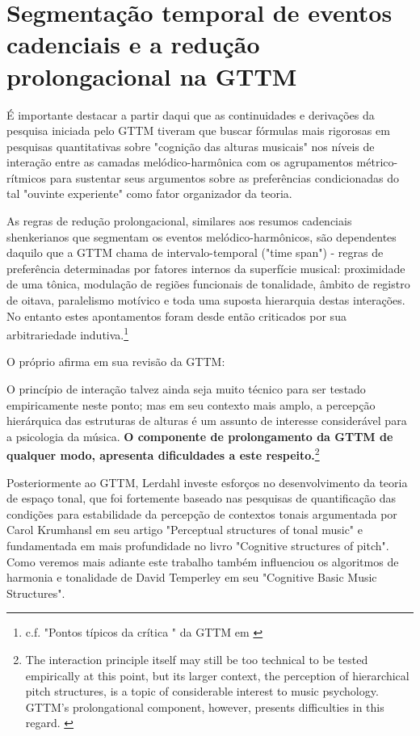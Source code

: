 \documentclass[
	12pt,				%
	openright,			%
	twoside,			%
	a4paper,			%
	english,			%
	french,				%
	spanish,			%
	brazil				%
	]{abntex2}
\begin{document}
\section{Segmentação temporal de eventos cadenciais e a redução prolongacional na GTTM}


É importante destacar a partir daqui que as continuidades e derivações da pesquisa iniciada pelo GTTM tiveram que buscar fórmulas mais rigorosas em pesquisas quantitativas sobre "cognição das alturas musicais"\cite{krumhansl1990cognitive} nos níveis de interação entre as camadas melódico-harmônica com os agrupamentos métrico-rítmicos para sustentar seus argumentos sobre as preferências condicionadas do tal "ouvinte experiente"\cite[pg. 118]{lerdahl1983generative} como fator organizador da teoria. 

As regras de redução prolongacional, similares aos resumos cadenciais shenkerianos que segmentam os eventos melódico-harmônicos, são dependentes daquilo que a GTTM chama de intervalo-temporal ("time span") - regras de preferência determinadas por fatores internos da superfície musical: proximidade de uma tônica, modulação de regiões funcionais de tonalidade, âmbito de registro de oitava, paralelismo motívico e toda uma suposta hierarquia destas interações. No entanto estes apontamentos foram desde então criticados por sua arbitrariedade indutiva.\footnote{ c.f. "Pontos típicos da crítica " da GTTM em \cite[pg. 35]{hansen2011legacy} }

O próprio  afirma em sua revisão da GTTM:


\begin{citacao}
O princípio de interação talvez ainda seja muito técnico para ser testado empiricamente neste ponto; mas em seu contexto mais amplo, a percepção hierárquica das estruturas de alturas é um assunto de interesse considerável para a psicologia da música.\textbf{ O componente de prolongamento da GTTM de qualquer modo, apresenta dificuldades a este respeito.}\cite[p. 191]{lerdahl2009genesis}\footnote{ The interaction principle itself may still be too technical to be tested empirically at this point, but its larger
context, the perception of hierarchical pitch structures, is a topic of considerable interest to music psychology. GTTM’s prolongational component, however, presents
difficulties in this regard. \cite[p. 191]{lerdahl2009genesis}}
\end{citacao}



Posteriormente ao GTTM, Lerdahl investe esforços no desenvolvimento da teoria de espaço tonal\cite{lerdahl1988tps}, que foi fortemente baseado nas pesquisas de quantificação das condições para estabilidade da percepção de contextos tonais argumentada por Carol Krumhansl em seu artigo "Perceptual structures of tonal music"\cite{krumhansl1983perceptual} e fundamentada em mais profundidade no livro "Cognitive structures of pitch"\cite{krumhansl1990cognitive}. Como veremos mais adiante este trabalho também influenciou os algoritmos de harmonia e tonalidade de David Temperley em seu "Cognitive Basic Music Structures"\cite{temperley2004cognition}. 
\end{document}
